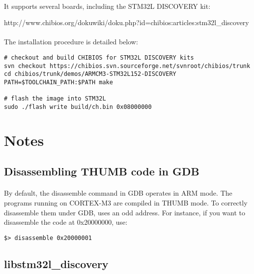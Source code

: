 \documentclass[a4paper, 11pt]{article}
\begin{document}
\paragraph{}
It supports several boards, including the STM32L DISCOVERY kit:
\begin{center}
http://www.chibios.org/dokuwiki/doku.php?id=chibios:articles:stm32l\_discovery
\end{center}

\paragraph{}
The installation procedure is detailed below:\\
\begin{small}
\begin{lstlisting}[frame=tb]
# checkout and build CHIBIOS for STM32L DISCOVERY kits
svn checkout https://chibios.svn.sourceforge.net/svnroot/chibios/trunk
cd chibios/trunk/demos/ARMCM3-STM32L152-DISCOVERY
PATH=$TOOLCHAIN_PATH:$PATH make

# flash the image into STM32L
sudo ./flash write build/ch.bin 0x08000000
\end{lstlisting}
\end{small}

\newpage
\section{Notes}

\subsection{Disassembling THUMB code in GDB}
\paragraph{}
By default, the disassemble command in GDB operates in ARM mode. The programs running on CORTEX-M3
are compiled in THUMB mode. To correctly disassemble them under GDB, uses an odd address. For instance,
if you want to disassemble the code at 0x20000000, use:\\
\begin{small}
\begin{lstlisting}[frame=tb]
$> disassemble 0x20000001
\end{lstlisting}
\end{small}


\subsection{libstm32l\_discovery}
\end{document}

